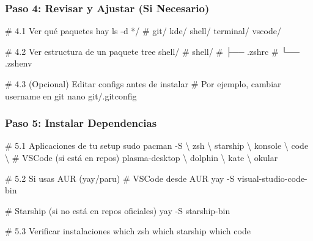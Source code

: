 \documentclass[
  doc,
  floatsintext,
  longtable,
  a4paper,
  nolmodern,
  notxfonts,
  notimes,
  12pt,
  colorlinks=true,linkcolor=blue,citecolor=blue,urlcolor=blue]{apa7}
\newenvironment{Shaded}{\begin{snugshade}}{\end{snugshade}}
\newcommand{\AttributeTok}[1]{\textcolor[rgb]{0.40,0.45,0.13}{#1}}
\newcommand{\CommentTok}[1]{\textcolor[rgb]{0.37,0.37,0.37}{#1}}
\newcommand{\DataTypeTok}[1]{\textcolor[rgb]{0.68,0.00,0.00}{#1}}
\newcommand{\ExtensionTok}[1]{\textcolor[rgb]{0.00,0.23,0.31}{#1}}
\newcommand{\FunctionTok}[1]{\textcolor[rgb]{0.28,0.35,0.67}{#1}}
\newcommand{\NormalTok}[1]{\textcolor[rgb]{0.00,0.23,0.31}{#1}}
\newcommand{\PreprocessorTok}[1]{\textcolor[rgb]{0.68,0.00,0.00}{#1}}
\begin{document}
\subsubsection{Paso 4: Revisar y Ajustar (Si
Necesario)}\label{paso-4-revisar-y-ajustar-si-necesario}

\begin{Shaded}
\begin{Highlighting}[]
\CommentTok{\# 4.1 Ver qué paquetes hay}
\FunctionTok{ls} \AttributeTok{{-}d} \PreprocessorTok{*}\NormalTok{/}
\CommentTok{\# git/  kde/  shell/  terminal/  vscode/}

\CommentTok{\# 4.2 Ver estructura de un paquete}
\ExtensionTok{tree}\NormalTok{ shell/}
\CommentTok{\# shell/}
\CommentTok{\# ├── .zshrc}
\CommentTok{\# └── .zshenv}

\CommentTok{\# 4.3 (Opcional) Editar configs antes de instalar}
\CommentTok{\# Por ejemplo, cambiar username en git}
\FunctionTok{nano}\NormalTok{ git/.gitconfig}
\end{Highlighting}
\end{Shaded}

\subsubsection{Paso 5: Instalar
Dependencias}\label{paso-5-instalar-dependencias}

\begin{Shaded}
\begin{Highlighting}[]
\CommentTok{\# 5.1 Aplicaciones de tu setup}
\FunctionTok{sudo}\NormalTok{ pacman }\AttributeTok{{-}S} \DataTypeTok{\textbackslash{}}
\NormalTok{    zsh }\DataTypeTok{\textbackslash{}}
\NormalTok{    starship }\DataTypeTok{\textbackslash{}}
\NormalTok{    konsole }\DataTypeTok{\textbackslash{}}
\NormalTok{    code }\DataTypeTok{\textbackslash{} } \CommentTok{\# VSCode (si está en repos)}
    \ExtensionTok{plasma{-}desktop} \DataTypeTok{\textbackslash{}}
\NormalTok{    dolphin }\DataTypeTok{\textbackslash{}}
\NormalTok{    kate }\DataTypeTok{\textbackslash{}}
\NormalTok{    okular}

\CommentTok{\# 5.2 Si usas AUR (yay/paru)}
\CommentTok{\# VSCode desde AUR}
\ExtensionTok{yay} \AttributeTok{{-}S}\NormalTok{ visual{-}studio{-}code{-}bin}

\CommentTok{\# Starship (si no está en repos oficiales)}
\ExtensionTok{yay} \AttributeTok{{-}S}\NormalTok{ starship{-}bin}

\CommentTok{\# 5.3 Verificar instalaciones}
\FunctionTok{which}\NormalTok{ zsh}
\FunctionTok{which}\NormalTok{ starship}
\FunctionTok{which}\NormalTok{ code}
\end{Highlighting}
\end{Shaded}
\end{document}
